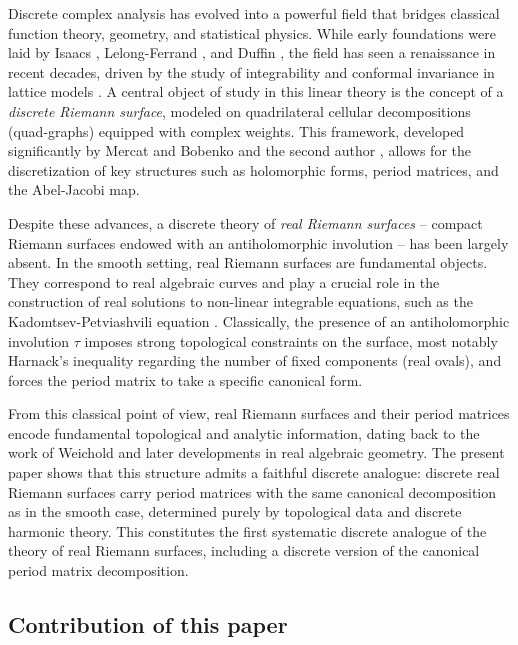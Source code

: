 \documentclass[11pt,a4paper]{article}
\theoremstyle{definition}
\begin{document}
Discrete complex analysis has evolved into a powerful field that bridges classical function theory, geometry, and statistical physics.
While early foundations were laid by Isaacs \cite{Is41}, Lelong-Ferrand \cite{Fe44}, and Duffin \cite{Du56}, the field has seen a renaissance in recent decades, driven by the study of integrability and conformal invariance in lattice models \cite{Sm10S, Ke02, ChSm11}.
A central object of study in this linear theory is the concept of a \emph{discrete Riemann surface}, modeled on quadrilateral cellular decompositions (quad-graphs) equipped with complex weights. This framework, developed significantly by Mercat \cite{Me01, Me07} and Bobenko and the second author \cite{BoG15, BoG17}, allows for the discretization of key structures such as holomorphic forms, period matrices, and the Abel-Jacobi map.

Despite these advances, a discrete theory of \emph{real Riemann surfaces} -- compact Riemann surfaces endowed with an antiholomorphic involution -- has been largely absent.
In the smooth setting, real Riemann surfaces are fundamental objects. They correspond to real algebraic curves \cite{Sil01, Vin93} and play a crucial role in the construction of real solutions to non-linear integrable equations, such as the Kadomtsev-Petviashvili equation \cite{BBEIM94}.
Classically, the presence of an antiholomorphic involution $\tau$ imposes strong topological constraints on the surface, most notably Harnack's inequality regarding the number of fixed components (real ovals), and forces the period matrix to take a specific canonical form.

From this classical point of view, real Riemann surfaces and their period matrices encode fundamental topological and analytic information, dating back to the work of Weichold and later developments in real algebraic geometry.
The present paper shows that this structure admits a faithful discrete analogue: discrete real Riemann surfaces carry period matrices with the same canonical decomposition as in the smooth case, determined purely by topological data and discrete harmonic theory.
This constitutes the first systematic discrete analogue of the theory of real Riemann surfaces, including a discrete version of the canonical period matrix decomposition.

\subsection{Contribution of this paper}
\end{document}
